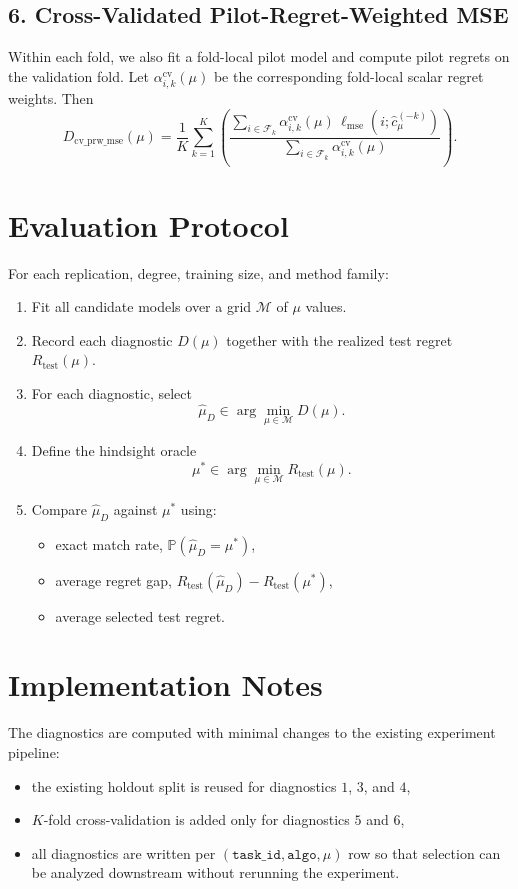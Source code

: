 \documentclass[11pt]{article}
\begin{document}
\subsection*{6. Cross-Validated Pilot-Regret-Weighted MSE}
Within each fold, we also fit a fold-local pilot model and compute pilot regrets on the validation fold. Let \(\alpha_{i,k}^{\mathrm{cv}}(\mu)\) be the corresponding fold-local scalar regret weights. Then
\[
D_{\mathrm{cv\_prw\_mse}}(\mu)
=
\frac{1}{K}\sum_{k=1}^K
\left(
\frac{\sum_{i \in \mathcal{F}_k} \alpha_{i,k}^{\mathrm{cv}}(\mu)\,\ell_{\mathrm{mse}}(i; \hat{c}_{\mu}^{(-k)})}
{\sum_{i \in \mathcal{F}_k} \alpha_{i,k}^{\mathrm{cv}}(\mu)}
\right).
\]

\section*{Evaluation Protocol}
For each replication, degree, training size, and method family:
\begin{enumerate}
    \item Fit all candidate models over a grid \(\mathcal{M}\) of \(\mu\) values.
    \item Record each diagnostic \(D(\mu)\) together with the realized test regret \(R_{\mathrm{test}}(\mu)\).
    \item For each diagnostic, select
    \[
    \hat{\mu}_D \in \arg\min_{\mu \in \mathcal{M}} D(\mu).
    \]
    \item Define the hindsight oracle
    \[
    \mu^* \in \arg\min_{\mu \in \mathcal{M}} R_{\mathrm{test}}(\mu).
    \]
    \item Compare \(\hat{\mu}_D\) against \(\mu^*\) using:
    \begin{itemize}
        \item exact match rate, \(\mathbb{P}(\hat{\mu}_D = \mu^*)\),
        \item average regret gap, \(R_{\mathrm{test}}(\hat{\mu}_D) - R_{\mathrm{test}}(\mu^*)\),
        \item average selected test regret.
    \end{itemize}
\end{enumerate}

\section*{Implementation Notes}
The diagnostics are computed with minimal changes to the existing experiment pipeline:
\begin{itemize}
    \item the existing holdout split is reused for diagnostics \(1\), \(3\), and \(4\),
    \item \(K\)-fold cross-validation is added only for diagnostics \(5\) and \(6\),
    \item all diagnostics are written per \((\texttt{task\_id}, \texttt{algo}, \mu)\) row so that selection can be analyzed downstream without rerunning the experiment.
\end{itemize}
\end{document}
